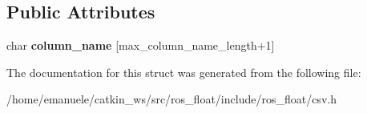 \subsection*{Public Attributes}
\begin{DoxyCompactItemize}
\item 
\mbox{\label{structio_1_1error_1_1with__column__name_af40ba00f1f035d363b099baf1f724323}} 
char {\bfseries column\+\_\+name} \mbox{[}max\+\_\+column\+\_\+name\+\_\+length+1\mbox{]}
\end{DoxyCompactItemize}


The documentation for this struct was generated from the following file\+:\begin{DoxyCompactItemize}
\item 
/home/emanuele/catkin\+\_\+ws/src/ros\+\_\+float/include/ros\+\_\+float/csv.\+h\end{DoxyCompactItemize}
